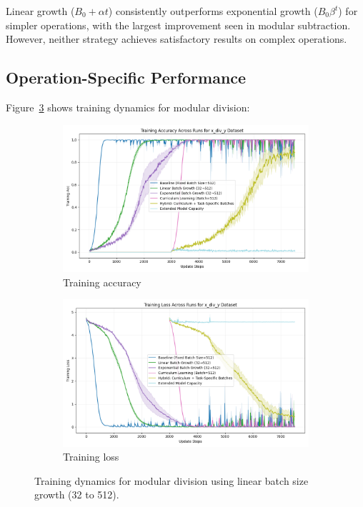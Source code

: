 \documentclass{article} %
\begin{document}
Linear growth ($B_0 + \alpha t$) consistently outperforms exponential growth ($B_0\beta^t$) for simpler operations, with the largest improvement seen in modular subtraction. However, neither strategy achieves satisfactory results on complex operations.

\subsection{Operation-Specific Performance}

Figure~\ref{fig:div-dynamics} shows training dynamics for modular division:

\begin{figure}[h]
\centering
\begin{subfigure}{0.49\textwidth}
\includegraphics[width=\textwidth]{train_acc_x_div_y.png}
\caption{Training accuracy}
\label{fig:div-acc}
\end{subfigure}
\hfill
\begin{subfigure}{0.49\textwidth}
\includegraphics[width=\textwidth]{train_loss_x_div_y.png}
\caption{Training loss}
\label{fig:div-loss}
\end{subfigure}
\caption{Training dynamics for modular division using linear batch size growth (32 to 512).}
\label{fig:div-dynamics}
\end{figure}
\end{document}
